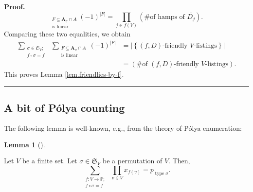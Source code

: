 \documentclass[numbers=enddot,12pt,final,onecolumn,notitlepage]{scrartcl}%
\numberwithin{exer}{section}
\theoremstyle{definition}
\newtheorem{lem}[theo]{Lemma}
\newenvironment{lemma}[1][]
{\begin{lem}[#1]\begin{leftbar}}
{\end{leftbar}\end{lem}}
\newenvironment{proof}[1][Proof]{\noindent\textbf{#1.} }{\ \rule{0.5em}{0.5em}}
\let\sumnonlimits\sum
\let\prodnonlimits\prod
\renewcommand{\sum}{\sumnonlimits\limits}
\renewcommand{\prod}{\prodnonlimits\limits}
\newenvironment{verlong}{}{}
\begin{document}
\begin{verlong}
\begin{proof}
\[_{\substack{F\subseteq\mathbf{A}_{\sigma}\cap A\\\text{is linear}}}\left(
-1\right)  ^{\left\vert F\right\vert }=\prod_{j\in f\left(  V\right)  }\left(
\text{\# of hamps of }\overline{D_{j}}\right)  .
\]
Comparing these two equalities, we obtain%
\begin{align*}
\sum_{\substack{\sigma\in\mathfrak{S}_{V};\\f\circ\sigma=f}}\ \ \sum
_{\substack{F\subseteq\mathbf{A}_{\sigma}\cap A\\\text{is linear}}}\left(
-1\right)  ^{\left\vert F\right\vert }  &  =\left\vert \left\{  \left(
f,D\right)  \text{-friendly }V\text{-listings}\right\}  \right\vert \\
&  =\left(  \text{\# of }\left(  f,D\right)  \text{-friendly }%
V\text{-listings}\right)  .
\end{align*}
This proves Lemma \ref{lem.friendlies-by-f}.
\end{proof}
\end{verlong}

\subsection{A bit of P\'{o}lya counting}

The following lemma is well-known, e.g., from the theory of P\'{o}lya enumeration:

\begin{lemma}
\label{lem.ptype-as-sum}Let $V$ be a finite set. Let $\sigma\in\mathfrak{S}%
_{V}$ be a permutation of $V$. Then,%
\[
\sum_{\substack{f:V\rightarrow\mathbb{P}\text{;}\\f\circ\sigma=f}%
}\ \ \prod_{v\in V}x_{f\left(  v\right)  }=p_{\operatorname*{type}\sigma}.
\]

\end{lemma}
\end{document}
